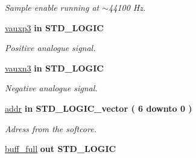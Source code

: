 \begin{DoxyCompactItemize}
\begin{DoxyCompactList}\small\item\em Sample enable running at $\sim$44100 Hz. \end{DoxyCompactList}\item 
\hypertarget{classADC__TOP_af2205ffee98e5aeaa144186159740393}{\hyperlink{classADC__TOP_af2205ffee98e5aeaa144186159740393}{vauxp3}  {\bfseries {\bfseries \textcolor{vhdlkeyword}{in}\textcolor{vhdlchar}{ }}} {\bfseries \textcolor{comment}{S\-T\-D\-\_\-\-L\-O\-G\-I\-C}\textcolor{vhdlchar}{ }} }\label{classADC__TOP_af2205ffee98e5aeaa144186159740393}

\begin{DoxyCompactList}\small\item\em Positive analogue signal. \end{DoxyCompactList}\item 
\hypertarget{classADC__TOP_a3d034bd2912bb721a5bd221c185c5c99}{\hyperlink{classADC__TOP_a3d034bd2912bb721a5bd221c185c5c99}{vauxn3}  {\bfseries {\bfseries \textcolor{vhdlkeyword}{in}\textcolor{vhdlchar}{ }}} {\bfseries \textcolor{comment}{S\-T\-D\-\_\-\-L\-O\-G\-I\-C}\textcolor{vhdlchar}{ }} }\label{classADC__TOP_a3d034bd2912bb721a5bd221c185c5c99}

\begin{DoxyCompactList}\small\item\em Negative analogue signal. \end{DoxyCompactList}\item 
\hypertarget{classADC__TOP_a57ff14de06cd6f4e021faa435aae362b}{\hyperlink{classADC__TOP_a57ff14de06cd6f4e021faa435aae362b}{addr}  {\bfseries {\bfseries \textcolor{vhdlkeyword}{in}\textcolor{vhdlchar}{ }}} {\bfseries \textcolor{comment}{S\-T\-D\-\_\-\-L\-O\-G\-I\-C\-\_\-vector}\textcolor{vhdlchar}{ }\textcolor{vhdlchar}{(}\textcolor{vhdlchar}{ }\textcolor{vhdlchar}{ } \textcolor{vhdldigit}{6} \textcolor{vhdlchar}{ }\textcolor{vhdlchar}{ }\textcolor{vhdlchar}{ }\textcolor{vhdlkeyword}{downto}\textcolor{vhdlchar}{ }\textcolor{vhdlchar}{ }\textcolor{vhdlchar}{ } \textcolor{vhdldigit}{0} \textcolor{vhdlchar}{ }\textcolor{vhdlchar}{)}\textcolor{vhdlchar}{ }} }\label{classADC__TOP_a57ff14de06cd6f4e021faa435aae362b}

\begin{DoxyCompactList}\small\item\em Adress from the softcore. \end{DoxyCompactList}\item 
\hypertarget{classADC__TOP_a1db73b91cf59fc8a5c0e360bbc004989}{\hyperlink{classADC__TOP_a1db73b91cf59fc8a5c0e360bbc004989}{buff\-\_\-full}  {\bfseries {\bfseries \textcolor{vhdlkeyword}{out}\textcolor{vhdlchar}{ }}} {\bfseries \textcolor{comment}{S\-T\-D\-\_\-\-L\-O\-G\-I\-C}\textcolor{vhdlchar}{ }} }\label{classADC__TOP_a1db73b91cf59fc8a5c0e360bbc004989}


\end{DoxyCompactItemize}
